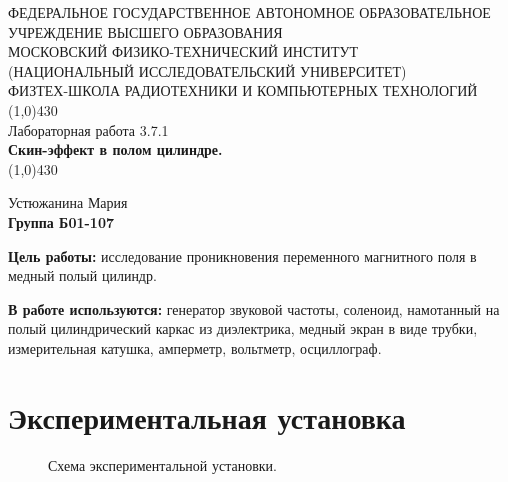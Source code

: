 \documentclass[11pt]{article}
\begin{document}
\begin{titlepage}
\begin{center}
\large{\small ФЕДЕРАЛЬНОЕ ГОСУДАРСТВЕННОЕ АВТОНОМНОЕ ОБРАЗОВАТЕЛЬНОЕ\\ УЧРЕЖДЕНИЕ ВЫСШЕГО ОБРАЗОВАНИЯ\\ МОСКОВСКИЙ ФИЗИКО-ТЕХНИЧЕСКИЙ ИНСТИТУТ\\ (НАЦИОНАЛЬНЫЙ ИССЛЕДОВАТЕЛЬСКИЙ УНИВЕРСИТЕТ)\\ ФИЗТЕХ-ШКОЛА РАДИОТЕХНИКИ И КОМПЬЮТЕРНЫХ ТЕХНОЛОГИЙ}
\vfill
\line(1,0){430}\\[1mm]
\huge{Лабораторная работа 3.7.1}\\
\huge\textbf{Скин-эффект в полом цилиндре.}\\
\line(1,0){430}\\[1mm]
\vfill
\begin{flushright}
\normalsize{Устюжанина Мария}\\
\normalsize{\textbf{Группа Б01-107}}\\
\end{flushright}
\end{center}
\end{titlepage}

\par \textbf{Цель работы:} исследование проникновения переменного магнитного поля в медный полый цилиндр.

\par \textbf{В работе используются:} генератор звуковой частоты, соленоид, намотанный на полый цилиндрический каркас из диэлектрика, медный экран в виде трубки, измерительная катушка, амперметр, вольтметр, осциллограф.

\section{Экспериментальная установка}
    \begin{figure}[H]
    \caption{Схема экспериментальной установки.}
    \label{pic:3}
    \end{figure}
\newpage
\end{document}
